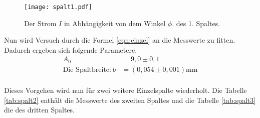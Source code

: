 \begin{figure}
  \centering
  \texttt{[image: spalt1.pdf]}
  \caption{ Der Strom $I$ in Abhängigkeit von dem Winkel $\phi$. des 1. Spaltes.}
  \label{fig:spalt1}
\end{figure}
\FloatBarrier
Nun wird Versuch durch die Formel \eqref{eqn:einzel} an die Messwerte zu fitten.
Dadurch ergeben sich folgende Parametere.
\begin{align*}
  A_0&=9,0\pm0,1\\
  \text{Die Spaltbreite:} \ b&=(0,054\pm0,001)\si{\milli\meter}\\
\end{align*}

Dieses Vorgehen wird nun für zwei weitere Einzelspalte wiederholt.
Die Tabelle \ref{tab:spalt2} enthält die Messwerte des zweiten Spaltes
und die Tabelle \ref{tab:spalt3} die des dritten Spaltes.




